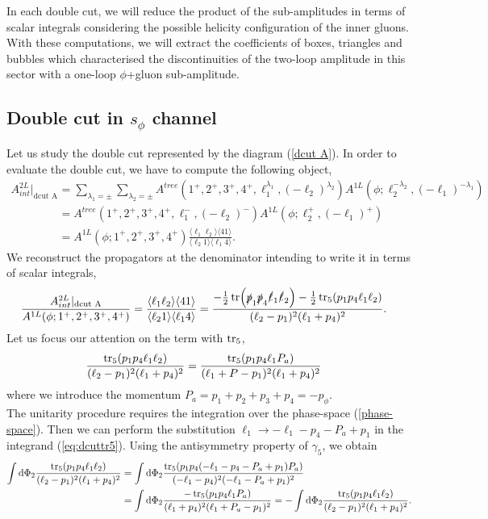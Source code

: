 In each double cut, we will reduce the product of the sub-amplitudes in terms of scalar integrals considering the possible helicity configuration of the inner gluons. With these computations, we will extract the coefficients of boxes, triangles and bubbles which characterised the discontinuities of the two-loop amplitude in this sector with a one-loop $\phi$+gluon sub-amplitude.
\subsection{Double cut in $s_{\phi}$ channel}
Let us study the double cut represented by the diagram (\ref{dcut A}). In order to evaluate the double cut, we have to compute the following object,
\begin{align*}
	A^{2L}_{int}|_{\text{dcut A}}&=\sum_{\lambda_1=\pm}\sum_{\lambda_2=\pm}A^{tree}(1^+,2^+,3^+,4^+,\ell_1^{\lambda_1},(-\ell_2)^{\lambda_2})A^{1L}(\phi;\ell_2^{-\lambda_2},(-\ell_1)^{-\lambda_1})\\
	&=A^{tree}(1^+,2^+,3^+,4^+,\ell_1^{-},(-\ell_2)^{-})A^{1L}(\phi;\ell_2^{+},(-\ell_1)^{+})\\
	&=A^{1L}(\phi;1^+,2^+,3^+,4^+)\frac{\langle \ell_1\ell_2\rangle \langle 41 \rangle}{\langle \ell_2 1\rangle \langle \ell_1 4\rangle}.
\end{align*}
We reconstruct the propagators at the denominator intending to write it in terms of scalar integrals,
\begin{align*}
	\frac{A^{2L}_{int}|_{\text{dcut A}}}{A^{1L}(\phi;1^+,2^+,3^+,4^+)}&=\frac{\langle \ell_1\ell_2\rangle \langle 41 \rangle}{\langle \ell_2 1\rangle \langle \ell_1 4\rangle}=\frac{-\frac{1}{2}\tr(\slashed{p}_1\slashed{p}_4\slashed{\ell}_1\slashed{\ell}_2)-\frac{1}{2}\tr_5(p_1{p}_4{\ell}_1{\ell}_2)}{(\ell_2-p_1)^2(\ell_1+p_4)^2}.
\end{align*}
Let us focus our attention on the term with $\tr_5$,
\begin{align}
	\frac{\tr_5({p}_1{p}_4{\ell}_1{\ell}_2)}{(\ell_2-p_1)^2(\ell_1+p_4)^2}&=\frac{\tr_5({p}_1{p}_4{\ell}_1{P}_a)}{(\ell_1+P-p_1)^2(\ell_1+p_4)^2} \label{eq:dcuttr5}
\end{align}
where we introduce the momentum $P_a=p_1+p_2+p_3+p_4=-p_\phi$.\\
The unitarity procedure requires the integration over the phase-space (\ref{phase-space}). Then we can perform the substitution $\ell_1\rightarrow -\ell_1-p_4-P_a+p_1$ in the integrand (\ref{eq:dcuttr5}). Using the antisymmetry property of $\gamma_5$, we obtain
\begin{align*}
	\int \dd\Phi_2 \frac{\tr_5({p}_1{p}_4{\ell}_1{\ell}_2)}{(\ell_2-p_1)^2(\ell_1+p_4)^2}&= \int \dd\Phi_2  \frac{\tr_5({p}_1{p}_4(-{\ell}_1-p_4-P_a+p_1){P}_a)}{(-\ell_1-p_4)^2(-\ell_1-P_a+p_1)^2}\\
	&=\int \dd\Phi_2  \frac{-\tr_5({p}_1{p}_4{\ell}_1{P}_a)}{(\ell_1+p_4)^2(\ell_1+P_a-p_1)^2}=- \int \dd\Phi_2 \frac{\tr_5({p}_1{p}_4{\ell}_1{\ell}_2)}{(\ell_2-p_1)^2(\ell_1+p_4)^2}.
\end{align*}
